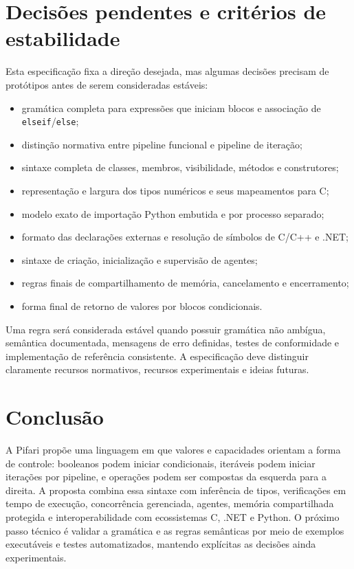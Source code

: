 \documentclass[12pt,a4paper]{article}
\begin{document}
\section{Decisões pendentes e critérios de estabilidade}
Esta especificação fixa a direção desejada, mas algumas decisões precisam de protótipos antes de serem consideradas estáveis:
\begin{itemize}
\item gramática completa para expressões que iniciam blocos e associação de \texttt{elseif}/\texttt{else};
\item distinção normativa entre pipeline funcional e pipeline de iteração;
\item sintaxe completa de classes, membros, visibilidade, métodos e construtores;
\item representação e largura dos tipos numéricos e seus mapeamentos para C;
\item modelo exato de importação Python embutida e por processo separado;
\item formato das declarações externas e resolução de símbolos de C/C++ e .NET;
\item sintaxe de criação, inicialização e supervisão de agentes;
\item regras finais de compartilhamento de memória, cancelamento e encerramento;
\item forma final de retorno de valores por blocos condicionais.
\end{itemize}

Uma regra será considerada estável quando possuir gramática não ambígua, semântica documentada, mensagens de erro definidas, testes de conformidade e implementação de referência consistente. A especificação deve distinguir claramente recursos normativos, recursos experimentais e ideias futuras.

\section{Conclusão}
A Pifari propõe uma linguagem em que valores e capacidades orientam a forma de controle: booleanos podem iniciar condicionais, iteráveis podem iniciar iterações por pipeline, e operações podem ser compostas da esquerda para a direita. A proposta combina essa sintaxe com inferência de tipos, verificações em tempo de execução, concorrência gerenciada, agentes, memória compartilhada protegida e interoperabilidade com ecossistemas C, .NET e Python. O próximo passo técnico é validar a gramática e as regras semânticas por meio de exemplos executáveis e testes automatizados, mantendo explícitas as decisões ainda experimentais.
\end{document}
